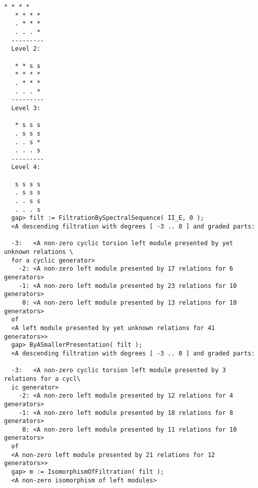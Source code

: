 \documentclass[a4paper,11pt]{report}
\begin{document}
{{{\begin{Verbatim}[fontsize=\small,frame=single,label=Example]
   * * * *
   * * * *
   . * * *
   . . . *
  ---------
  Level 2:
  
   * * s s
   * * * *
   . * * *
   . . . *
  ---------
  Level 3:
  
   * s s s
   . s s s
   . . s *
   . . . s
  ---------
  Level 4:
  
   s s s s
   . s s s
   . . s s
   . . . s
  gap> filt := FiltrationBySpectralSequence( II_E, 0 );
  <A descending filtration with degrees [ -3 .. 0 ] and graded parts:
  
  -3:	<A non-zero cyclic torsion left module presented by yet unknown relations \
  for a cyclic generator>
    -2:	<A non-zero left module presented by 17 relations for 6 generators>
    -1:	<A non-zero left module presented by 23 relations for 10 generators>
     0:	<A non-zero left module presented by 13 relations for 10 generators>
  of
  <A left module presented by yet unknown relations for 41 generators>>
  gap> ByASmallerPresentation( filt );
  <A descending filtration with degrees [ -3 .. 0 ] and graded parts:
  
  -3:	<A non-zero cyclic torsion left module presented by 3 relations for a cycl\
  ic generator>
    -2:	<A non-zero left module presented by 12 relations for 4 generators>
    -1:	<A non-zero left module presented by 18 relations for 8 generators>
     0:	<A non-zero left module presented by 11 relations for 10 generators>
  of
  <A non-zero left module presented by 21 relations for 12 generators>>
  gap> m := IsomorphismOfFiltration( filt );
  <A non-zero isomorphism of left modules>
\end{Verbatim}
 }

 
}}
\end{document}
